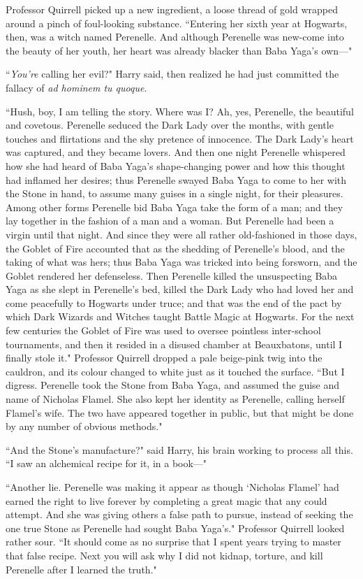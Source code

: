 Professor Quirrell picked up a new ingredient, a loose thread of gold wrapped around a pinch of foul-looking substance. ``Entering her sixth year at Hogwarts, then, was a witch named Perenelle. And although Perenelle was new-come into the beauty of her youth, her heart was already blacker than Baba Yaga's own—"

``\emph{You're} calling her evil?" Harry said, then realized he had just committed the fallacy of \emph{ad hominem tu quoque}.

``Hush, boy, I am telling the story. Where was I? Ah, yes, Perenelle, the beautiful and covetous. Perenelle seduced the Dark Lady over the months, with gentle touches and flirtations and the shy pretence of innocence. The Dark Lady's heart was captured, and they became lovers. And then one night Perenelle whispered how she had heard of Baba Yaga's shape-changing power and how this thought had inflamed her desires; thus Perenelle swayed Baba Yaga to come to her with the Stone in hand, to assume many guises in a single night, for their pleasures. Among other forms Perenelle bid Baba Yaga take the form of a man; and they lay together in the fashion of a man and a woman. But Perenelle had been a virgin until that night. And since they were all rather old-fashioned in those days, the Goblet of Fire accounted that as the shedding of Perenelle's blood, and the taking of what was hers; thus Baba Yaga was tricked into being forsworn, and the Goblet rendered her defenseless. Then Perenelle killed the unsuspecting Baba Yaga as she slept in Perenelle's bed, killed the Dark Lady who had loved her and come peacefully to Hogwarts under truce; and that was the end of the pact by which Dark Wizards and Witches taught Battle Magic at Hogwarts. For the next few centuries the Goblet of Fire was used to oversee pointless inter-school tournaments, and then it resided in a disused chamber at Beauxbatons, until I finally stole it." Professor Quirrell dropped a pale beige-pink twig into the cauldron, and its colour changed to white just as it touched the surface. ``But I digress. Perenelle took the Stone from Baba Yaga, and assumed the guise and name of Nicholas Flamel. She also kept her identity as Perenelle, calling herself Flamel's wife. The two have appeared together in public, but that might be done by any number of obvious methods."

``And the Stone's manufacture?" said Harry, his brain working to process all this. ``I saw an alchemical recipe for it, in a book—"

``Another lie. Perenelle was making it appear as though `Nicholas Flamel' had earned the right to live forever by completing a great magic that any could attempt. And she was giving others a false path to pursue, instead of seeking the one true Stone as Perenelle had sought Baba Yaga's." Professor Quirrell looked rather sour. ``It should come as no surprise that I spent years trying to master that false recipe. Next you will ask why I did not kidnap, torture, and kill Perenelle after I learned the truth."

